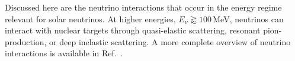 Discussed here are the neutrino interactions that occur in the energy regime
relevant for solar neutrinos.
At higher energies, $E_{\nu} \gtrapprox 100$\,MeV, neutrinos can interact
with nuclear targets through quasi-elastic scattering, resonant
pion-production, or deep inelastic scattering.
A more complete overview of neutrino interactions is available in Ref.~\citep{neutrino_xsec}.


